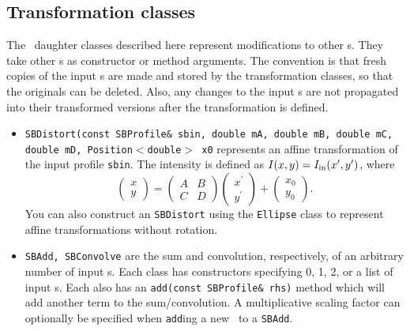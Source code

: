 \documentclass[11pt,preprint,flushrt]{aastex}
\begin{document}
\subsection{Transformation classes}
The \sbp\ daughter classes described here represent modifications to other {\sbp}s.  They take other {\sbp}s as constructor or method arguments.  The convention is that fresh copies of the input {\sbp}s are made and stored by the transformation classes, so that the originals can be deleted.  Also, any changes to the input {\sbp}s are not propagated into their transformed versions after the transformation is defined.
\begin{itemize}
\item {\tt SBDistort(const SBProfile\& sbin, double mA, double mB, double mC, double mD, Position$<$double$>$ x0} represents an affine transformation of the input profile {\tt sbin}.  The intensity is defined as $I(x,y) = I_{\rm in}(x^\prime,y^\prime)$, where
\begin{equation}
\left( \begin{array}{c} x \\ y \end{array} \right)
= 
\left( \begin{array}{cc}
A & B \\
C & D 
\end{array} \right)
\left( \begin{array}{c} x^\prime \\ y^\prime \end{array} \right)
+ 
\left( \begin{array}{c} x_0 \\ y_0 \end{array} \right).
\end{equation}
You can also construct an {\tt SBDistort} using the {\tt Ellipse} class to represent affine transformations without rotation.
\item {\tt SBAdd, SBConvolve} are the sum and convolution, respectively, of an arbitrary number of input {\sbp}s.  Each class has constructors specifying 0, 1, 2, or a list of input {\sbp}s.  Each also has an {\tt add(const SBProfile\& rhs)} method which will add another term to the sum/convolution.  A multiplicative scaling factor can optionally be specified when {\tt add}ing a new \sbp\ to a {\tt SBAdd}.
\end{itemize}
\end{document}
